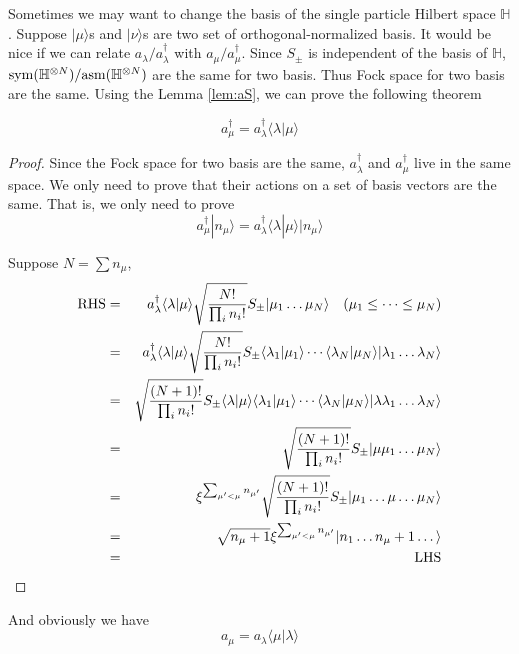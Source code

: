 \documentclass[12pt]{book}
\begin{document}
	Sometimes we may want to change the basis of the single particle Hilbert space $\mathbb H$. Suppose $|\mu\rangle$s and $|\nu\rangle$s are two set of orthogonal-normalized basis. It would be nice if we can relate $a_\lambda/a_\lambda^\dagger$ with $a_\mu/a_\mu^\dagger$. Since $S_\pm$ is independent of the basis of $\mathbb H$, ${\rm sym}(\mathbb H^{\otimes N})/{\rm asm}(\mathbb H^{\otimes N})$ are the same for two basis. Thus Fock space for two basis are the same. Using the Lemma \ref{lem:aS}, we can prove the following theorem
	\begin{theorem}
		\begin{equation}
			a_\mu^\dagger=a_\lambda^\dagger\langle\lambda|\mu\rangle
		\end{equation}
	\end{theorem}
	\begin{proof}
		Since the Fock space for two basis are the same, $a_\lambda^\dagger$ and $a_\mu^\dagger$ live in the same space. We only need to prove that their actions on a set of basis vectors are the same. That is, we only need to prove
		\begin{equation}
			a_\mu^\dagger|n_\mu\rangle=a_\lambda^\dagger\langle\lambda|\mu\rangle|n_\mu\rangle
		\end{equation}
		
		Suppose $N=\sum n_\mu$,
		\begin{eqnarray}
			{\rm RHS}&=&a_\lambda^\dagger\langle\lambda|\mu\rangle\sqrt{\frac{N!}{\prod_i n_i!}}S_\pm|\mu_1\dots\mu_N\rangle\quad(\mu_1\leq\cdots\leq\mu_N)\\
			&=&a_\lambda^\dagger\langle\lambda|\mu\rangle\sqrt{\frac{N!}{\prod_i n_i!}}S_\pm\langle\lambda_1|\mu_1\rangle\cdots\langle\lambda_N|\mu_N\rangle|\lambda_1\dots\lambda_N\rangle\\
			&=&\sqrt{\frac{(N+1)!}{\prod_i n_i!}}S_\pm\langle\lambda|\mu\rangle\langle\lambda_1|\mu_1\rangle\cdots\langle\lambda_N|\mu_N\rangle|\lambda\lambda_1\dots\lambda_N\rangle\\
			&=&\sqrt{\frac{(N+1)!}{\prod_i n_i!}}S_\pm|\mu\mu_1\dots\mu_N\rangle\\
			&=&\xi^{\sum_{\mu'<\mu}n_{\mu'}}\sqrt{\frac{(N+1)!}{\prod_i n_i!}}S_\pm|\mu_1\dots\mu\dots\mu_N\rangle\\
			&=&\sqrt{n_\mu+1}\xi^{\sum_{\mu'<\mu}n_{\mu'}}|n_1\dots n_\mu+1\dots\rangle\\
			&=&{\rm LHS}
		\end{eqnarray}
	\end{proof}
	And obviously we have
	\begin{equation}
		a_\mu=a_\lambda\langle\mu|\lambda\rangle
	\end{equation}
\end{document}
